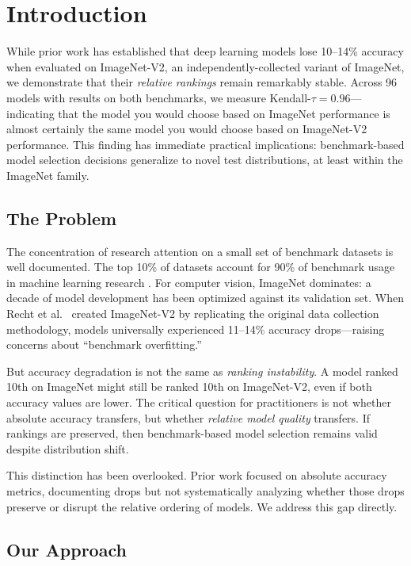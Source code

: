 \section{Introduction}
\label{sec:introduction}

While prior work has established that deep learning models lose 10--14\% accuracy when evaluated on ImageNet-V2, an independently-collected variant of ImageNet, we demonstrate that their \emph{relative rankings} remain remarkably stable. Across 96 models with results on both benchmarks, we measure Kendall-$\tau = 0.96$---indicating that the model you would choose based on ImageNet performance is almost certainly the same model you would choose based on ImageNet-V2 performance. This finding has immediate practical implications: benchmark-based model selection decisions generalize to novel test distributions, at least within the ImageNet family.

\subsection{The Problem}

The concentration of research attention on a small set of benchmark datasets is well documented. The top 10\% of datasets account for 90\% of benchmark usage in machine learning research \cite{koch2021reduced}. For computer vision, ImageNet dominates: a decade of model development has been optimized against its validation set. When Recht et al.~\cite{recht2019imagenet} created ImageNet-V2 by replicating the original data collection methodology, models universally experienced 11--14\% accuracy drops---raising concerns about ``benchmark overfitting.''

But accuracy degradation is not the same as \emph{ranking instability}. A model ranked 10th on ImageNet might still be ranked 10th on ImageNet-V2, even if both accuracy values are lower. The critical question for practitioners is not whether absolute accuracy transfers, but whether \emph{relative model quality} transfers. If rankings are preserved, then benchmark-based model selection remains valid despite distribution shift.

This distinction has been overlooked. Prior work focused on absolute accuracy metrics, documenting drops but not systematically analyzing whether those drops preserve or disrupt the relative ordering of models. We address this gap directly.

\subsection{Our Approach}

